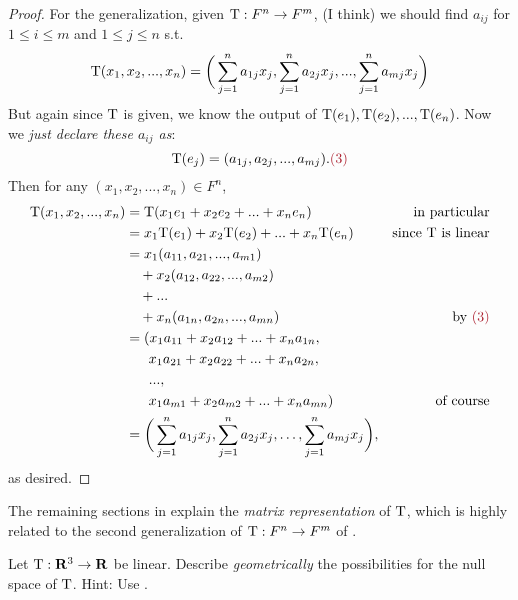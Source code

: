 \begin{proof}
For the generalization, given \(\mathrm{T} : F^n \to F^m\), (I think) we should find \(a_{ij}\) for \(1 \le i \le m\) and \(1 \le j \le n\) s.t.
\[
    \mathrm{T}(x_1, x_2, ..., x_n) = \bigg(\sum_{j = 1}^n a_{1 j} x_{j}, \sum_{j = 1}^n a_{2 j} x_{j}, ..., \sum_{j = 1}^n a_{m j} x_{j} \bigg)
\]
But again since \(\mathrm{T}\) is given, we know the output of \(\mathrm{T}(e_1), \mathrm{T}(e_2), ..., \mathrm{T}(e_n)\).
Now we \emph{just declare these \(a_{ij}\) as}:
\[
    \T(e_j) = (a_{1j}, a_{2j}, ..., a_{mj}). \MAROON{(3)}
\]
Then for any \((x_1, x_2, ..., x_n) \in F^n\),
\begin{align*}
    \T(x_1, x_2, ..., x_n) & = \T(x_1 e_1 + x_2 e_2 + ... + x_n e_n) & \text{in particular} \\
                           & = x_1 \T(e_1) + x_2 \T(e_2) + ... + x_n \T(e_n) & \text{since \(\T\) is linear} \\
                           & = x_1 (a_{11}, a_{21}, ..., a_{m1}) \\
                           & \ \ \ + x_2 (a_{12}, a_{22}, ..., a_{m2}) \\
                           & \ \ \ + ... \\
                           & \ \ \ + x_n (a_{1n}, a_{2n}, ..., a_{mn}) & \text{by \MAROON{(3)}} \\
                           & = (x_1 a_{11} + x_2 a_{12} + ... + x_n a_{1n}, \\
                           & \ \ \ \ \ x_1 a_{21} + x_2 a_{22} + ... + x_n a_{2n}, \\
                           & \ \ \ \ \ ..., \\
                           & \ \ \ \ \ x_1 a_{m1} + x_2 a_{m2} + ... + x_n a_{mn}) & \text{of course} \\
                           & = \bigg(\sum_{j=1}^n a_{1 j} x_{j}, \sum_{j=1}^n a_{2 j} x_{j}, \ldots, \sum_{j=1}^n a_{m j} x_{j} \bigg),
\end{align*}
as desired.
\end{proof}

\begin{note}
The remaining sections in  explain the \emph{matrix representation} of \(\mathrm{T}\), which is highly related to the second generalization of \(\mathrm{T}: F^n \to F^m\) of .
\end{note}

\begin{exercise} \label{exercise 2.1.23}
Let \(\mathrm{T}: \mathbf{R}^3 \to \mathbf{R}\) be linear.
Describe \emph{geometrically} the possibilities for the null space of \(\mathrm{T}\).
Hint: Use .
\end{exercise}

